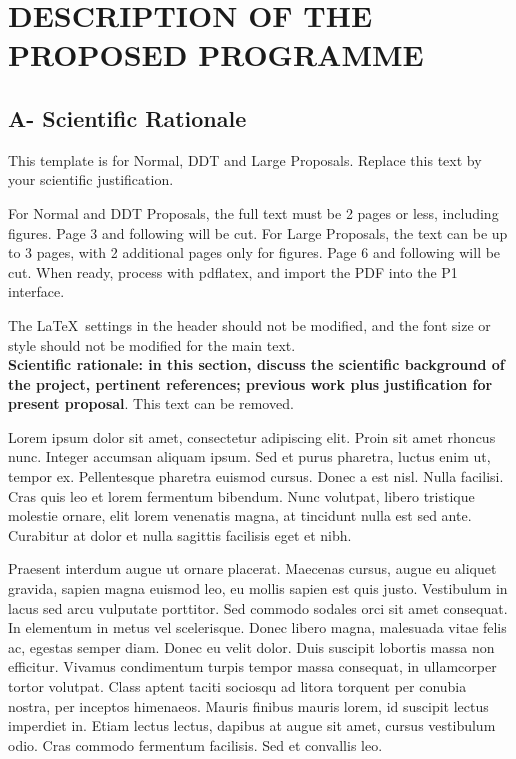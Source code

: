\documentclass{article}
\begin{document}
\section{DESCRIPTION OF THE PROPOSED PROGRAMME}
\subsection{A- Scientific Rationale}

This template is for Normal, DDT and Large Proposals. Replace this text by your scientific justification. 

For Normal and DDT Proposals, the full text must be 2 pages or less, including figures. Page 3 and following will be cut. For Large Proposals, the text can be up to 3 pages, with 2 additional pages only for figures. Page 6 and following will be cut. When ready, process with pdflatex, and import the PDF into the P1 interface. 

The \LaTeX\ settings in the header should not be modified, and the font size or style should not be modified for the main text.\\


{\bf Scientific rationale: in this section, discuss the scientific background of  the project, pertinent references; previous work plus justification for present proposal}. This text can be removed.

Lorem ipsum dolor sit amet, consectetur adipiscing elit. Proin sit amet rhoncus nunc. Integer accumsan aliquam ipsum. Sed et purus pharetra, luctus enim ut, tempor ex. Pellentesque pharetra euismod cursus. Donec a est nisl. Nulla facilisi. Cras quis leo et lorem fermentum bibendum. Nunc volutpat, libero tristique molestie ornare, elit lorem venenatis magna, at tincidunt nulla est sed ante. Curabitur at dolor et nulla sagittis facilisis eget et nibh.

Praesent interdum augue ut ornare placerat. Maecenas cursus, augue eu aliquet gravida, sapien magna euismod leo, eu mollis sapien est quis justo. Vestibulum in lacus sed arcu vulputate porttitor. Sed commodo sodales orci sit amet consequat. In elementum in metus vel scelerisque. Donec libero magna, malesuada vitae felis ac, egestas semper diam. Donec eu velit dolor. Duis suscipit lobortis massa non efficitur. Vivamus condimentum turpis tempor massa consequat, in ullamcorper tortor volutpat. Class aptent taciti sociosqu ad litora torquent per conubia nostra, per inceptos himenaeos. Mauris finibus mauris lorem, id suscipit lectus imperdiet in. Etiam lectus lectus, dapibus at augue sit amet, cursus vestibulum odio. Cras commodo fermentum facilisis. Sed et convallis leo.
\end{document}
